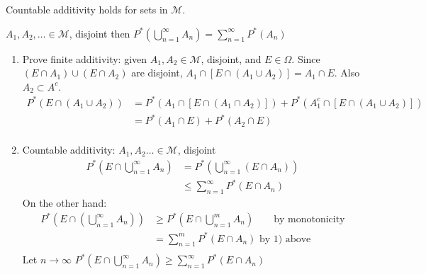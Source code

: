 \documentclass[class=article,crop=false]{standalone}
\begin{document}
\begin{lem}[2]
Countable additivity holds for sets in $\mathcal{M}$.
\end{lem}
\begin{note}[]
	$A_1,A_2,\ldots \in \mathcal{M}$, disjoint then $P^* (\bigcup_{n= 1}^{\infty} A_n)=\sum_{ n=1}^{\infty} P^* (A_n)$
\end{note}
\begin{prf}
\begin{enumerate}[label=\arabic*)]
	\item Prove finite additivity: given $A_1,A_2 \in \mathcal{M}$, disjoint, and $E \in \Omega$. Since $(E \cap A_1) \cup (E \cap A_2)$ are disjoint, $A_1 \cap [E \cap (A_1 \cup A_2)] = A_1 \cap E$. Also $A_2 \subset A^{c}$. 
		\begin{align*}
			P^* (E\cap (A_1 \cup A_2)) &= P^* (A_1 \cap [E \cap (A_1 \cap A_2)]) + P^* (A_1^{c} \cap [E \cap (A_1 \cup A_2)]) \\
						  &=  P^* (A_1 \cap E) + P^* (A_2 \cap E)\\
		\end{align*}
	\item Countable additivity: $A_1, A_2\ldots \in \mathcal{M}$, disjoint
		\begin{align*}
			P^* (E \cap \bigcup_{n= 1}^{\infty} A_n) &= P^* (\bigcup_{n= 1}^{\infty} (E \cap A_n)) \\
			&\leq \sum_{ n=1}^{\infty} P^* (E \cap A_n)
		\end{align*}
		On the other hand:
		\begin{align*}
			P^* \left(E\cap \left( \bigcup_{n= 1}^{\infty} A_n \right) \right) &\geq P^* \left( E \cap \bigcup_{n= 1}^{m} A_n \right) \qquad \text{by monotonicity} \\
										&= \sum_{ n=1}^{m} P^* (E\cap A_n) \text{ by 1) above}  \\
		\end{align*}
		Let $n \to \infty$
		$P^* (E \cap \bigcup_{n= 1}^{\infty} A_n) \geq \sum_{ n=1}^{\infty} P^* (E\cap A_n)$
\end{enumerate}
\end{prf}
\end{document}
